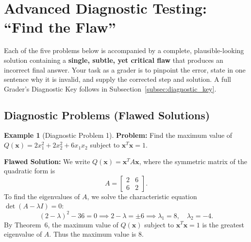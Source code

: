 \documentclass[11pt, letterpaper]{article}
\theoremstyle{definition}
\newtheorem{example}{Example}[section]
\theoremstyle{remark}
\begin{document}
\section{Advanced Diagnostic Testing: ``Find the Flaw''}

Each of the five problems below is accompanied by a complete, plausible-looking solution containing a \textbf{single, subtle, yet critical flaw} that produces an incorrect final answer. Your task as a grader is to pinpoint the error, state in one sentence why it is invalid, and supply the corrected step and solution. A full Grader's Diagnostic Key follows in Subsection~\ref{subsec:diagnostic_key}.

\subsection{Diagnostic Problems (Flawed Solutions)}

\begin{example}[Diagnostic Problem 1]
\textbf{Problem:} Find the maximum value of $Q(\mathbf{x}) = 2x_1^2 + 2x_2^2 + 6x_1x_2$ subject to $\mathbf{x}^T \mathbf{x} = 1$.

\textbf{Flawed Solution:}
We write $Q(\mathbf{x}) = \mathbf{x}^T A \mathbf{x}$, where the symmetric matrix of the quadratic form is
\[
A = \begin{bmatrix} 2 & 6 \\ 6 & 2 \end{bmatrix}.
\]
To find the eigenvalues of $A$, we solve the characteristic equation $\det(A - \lambda I) = 0$:
\[
(2 - \lambda)^2 - 36 = 0 \implies 2 - \lambda = \pm 6 \implies \lambda_1 = 8, \quad \lambda_2 = -4.
\]
By Theorem~6, the maximum value of $Q(\mathbf{x})$ subject to $\mathbf{x}^T \mathbf{x} = 1$ is the greatest eigenvalue of $A$. Thus the maximum value is $8$.
\end{example}
\end{document}

